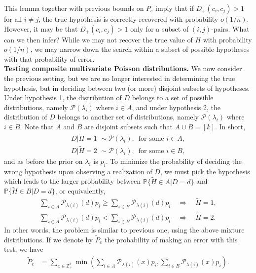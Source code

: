 \documentclass[11pt]{article}
\newcommand{\dd}{D_+}
\newcommand{\mZ}{\mathbb{Z}}
\newcommand{\pp}{\mathbb{P}}
\newcommand{\1}{\mathbb{1}}
\begin{document}
This lemma together with previous bounds on $P_e$ imply that if $\dd(c_i,c_j) > 1$ for all $i \neq j$, the true hypothesis is correctly recovered with probability $o(1/n)$. However, it may be that $\dd(c_i,c_j) > 1$ only for a subset of $(i,j)$-pairs. What can we then infer? While we may not recover the true value of $H$ with probability $o(1/n)$, we may narrow down the search within a subset of possible hypotheses with that probability of error.\\

{\bf Testing composite multivariate Poisson distributions.} We now consider the previous setting, but we are no longer interested in determining the true hypothesis, but in deciding between two (or more) disjoint subsets of hypotheses. Under hypothesis 1, the distribution of $D$ belongs to a set of possible distributions, namely $\mathcal{P}(\lambda_i)$ where $i \in A$, and under hypothesis 2, the distribution of $D$ belongs to another set of distributions, namely $\mathcal{P}(\lambda_i)$ where $i \in B$. Note that $A$ and $B$ are disjoint subsets such that $A \cup B=[k]$. In short,
\begin{align}
D|\tilde{H}=1 \,\, \sim \mathcal{P}(\lambda_i), \,\,\, \text{for some } i \in A, \\
D|\tilde{H}=2 \,\, \sim \mathcal{P}(\lambda_i), \,\,\, \text{for some } i \in B,
\end{align}
and as before the prior on $\lambda_i$ is $p_i$. To minimize the probability of deciding the wrong hypothesis upon observing a realization of $D$, we must pick the hypothesis which leads to the larger probability between $\pp\{\tilde{H} \in A | D=d\}$ and $\pp\{\tilde{H} \in B | D=d\}$, or equivalently, 
\begin{align}
\sum_{i \in A} \mathcal{P}_{\lambda(i)}(d) p_{i} \geq \sum_{i \in B} \mathcal{P}_{\lambda(i)}(d) p_{i} \quad \Rightarrow \quad \tilde{H}=1,\\
\sum_{i \in A} \mathcal{P}_{\lambda(i)}(d) p_{i} < \sum_{i \in B} \mathcal{P}_{\lambda(i)}(d) p_{i} \quad \Rightarrow \quad \tilde{H}=2.
\end{align}
In other words, the problem is similar to previous one, using the above mixture distributions. 
If we denote by $\tilde{P}_e$ the probability of making an error with this test, we have 
\begin{align}
\tilde{P}_e &= \sum_{x \in \mZ_+^k} \min\left(\sum_{i \in A} \mathcal{P}_{\lambda(i)}(x) p_{i} , \sum_{i \in B} \mathcal{P}_{\lambda(i)}(x) p_{i} \right).
\end{align}
\end{document}
